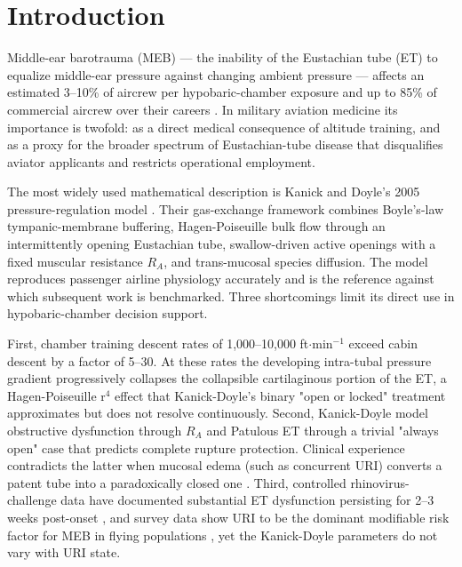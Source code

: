 \documentclass[11pt,a4paper]{article}
\begin{document}
\section{Introduction}

Middle-ear barotrauma (MEB) --- the inability of the Eustachian tube (ET) to equalize middle-ear pressure against changing ambient pressure --- affects an estimated 3--10\% of aircrew per hypobaric-chamber exposure \citep{Morgagni2012,Landolfi2009,Morgagni2010} and up to 85\% of commercial aircrew over their careers \citep{Lindfors2021}. In military aviation medicine its importance is twofold: as a direct medical consequence of altitude training, and as a proxy for the broader spectrum of Eustachian-tube disease that disqualifies aviator applicants and restricts operational employment.

The most widely used mathematical description is Kanick and Doyle's 2005 pressure-regulation model \citep{Kanick2005}. Their gas-exchange framework combines Boyle's-law tympanic-membrane buffering, Hagen-Poiseuille bulk flow through an intermittently opening Eustachian tube, swallow-driven active openings with a fixed muscular resistance $R_A$, and trans-mucosal species diffusion. The model reproduces passenger airline physiology accurately and is the reference against which subsequent work is benchmarked. Three shortcomings limit its direct use in hypobaric-chamber decision support.

First, chamber training descent rates of 1,000--10,000 ft$\cdot$min$^{-1}$ exceed cabin descent by a factor of 5--30. At these rates the developing intra-tubal pressure gradient progressively collapses the collapsible cartilaginous portion of the ET, a Hagen-Poiseuille r$^{4}$ effect that Kanick-Doyle's binary "open or locked" treatment approximates but does not resolve continuously. Second, Kanick-Doyle model obstructive dysfunction through $R_A$ and Patulous ET through a trivial "always open" case that predicts complete rupture protection. Clinical experience contradicts the latter when mucosal edema (such as concurrent URI) converts a patent tube into a paradoxically closed one \citep{Kobayashi2018,Kikuchi2017,Shindo2025}. Third, controlled rhinovirus-challenge data have documented substantial ET dysfunction persisting for 2--3 weeks post-onset \citep{McBride1989,Buchman1994,Doyle1999}, and survey data show URI to be the dominant modifiable risk factor for MEB in flying populations \citep{Lindfors2021,Boel2017}, yet the Kanick-Doyle parameters do not vary with URI state.
\end{document}
